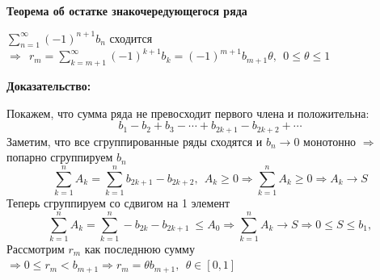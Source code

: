 \documentclass[a4paper,11pt]{article}
\newcommand{\Theorem}[3]{ 
\noindent\makebox[\linewidth]{\rule{\textwidth}{2pt}}

\noindent \textbf{#1} 
 
 #2
 
 \noindent\makebox[\linewidth]{\rule{\textwidth}{2pt}}
 \noindent \textbf{Доказательство:}
 
 #3
 
 \noindent\makebox[\linewidth]{\rule{\textwidth}{2pt}}
 }
\newcommand{\SUM}{\sum\limits_{n = 1}^{\infty}}
\newcommand{\Sum}{\sum\limits_{k = 1}^n}
\begin{document}
\Theorem{Теорема об остатке знакочередующегося ряда}{\label{Th:signremainder}
$\SUM (-1)^{n+1} b_n$ сходится $\Rightarrow \ \ r_m = \sum\limits_{k = m + 1}^{\infty} (-1)^{k+1} b_k = (-1)^{m+1} b_{m+1} \theta, \ \ 0 \leq \theta \leq 1 $
}{
Покажем, что сумма ряда не превосходит первого члена и положительна:
\[
b_1 - b_2 + b_3 - \cdots + b_{2k+1} - b_{2k+2} + \cdots
\]
Заметим, что все сгруппированные ряды сходятся и  $b_n \to 0$ монотонно $\Rightarrow$ попарно сгруппируем $b_n$ 
\[
\Sum A_k = \Sum b_{2k+1} - b_{2k+2}, \ \ A_k \geq 0 \Rightarrow \Sum A_k \geq 0 \Rightarrow A_k \to S
\]
Теперь сгруппируем со сдвигом на 1 элемент
\[
\Sum A_k  =  \Sum  - b_{2k} - b_{2k+1} \ \leq A_0 \Rightarrow \Sum A_k \to S \Rightarrow 0 \leq S \leq b_1,
\]
Рассмотрим $r_m$ как последнюю сумму $\Rightarrow 0 \leq r_m < b_{m+1} \Rightarrow r_m = \theta b_{m+1}, \ \ \theta \in [0, 1]$
}
\end{document}
